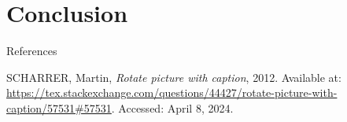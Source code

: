 \section{Conclusion}

\begin{frame}{References}
    \footnotesize
    \begin{thebibliography}{99}
         SCHARRER, Martin, \textit{Rotate picture with caption}, 2012. 
        Available at: \url{https://tex.stackexchange.com/questions/44427/rotate-picture-with-caption/57531\#57531}. 
        Accessed: April 8, 2024.
    \end{thebibliography}
\end{frame}
